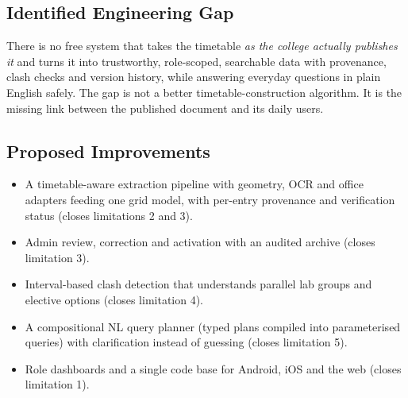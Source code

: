 \subsection{Identified Engineering Gap}
There is no free system that takes the timetable \emph{as the college actually publishes it} and
turns it into trustworthy, role-scoped, searchable data with provenance, clash checks and version
history, while answering everyday questions in plain English safely. The gap is not a better
timetable-construction algorithm. It is the missing link between the published document and its
daily users.

\subsection{Proposed Improvements}
\begin{itemize}
\item A timetable-aware extraction pipeline with geometry, OCR and office adapters feeding one grid
      model, with per-entry provenance and verification status (closes limitations 2 and 3).
\item Admin review, correction and activation with an audited archive (closes limitation 3).
\item Interval-based clash detection that understands parallel lab groups and elective options
      (closes limitation 4).
\item A compositional NL query planner (typed plans compiled into parameterised queries) with clarification instead of guessing
      (closes limitation 5).
\item Role dashboards and a single code base for Android, iOS and the web (closes limitation 1).
\end{itemize}

\newpage
